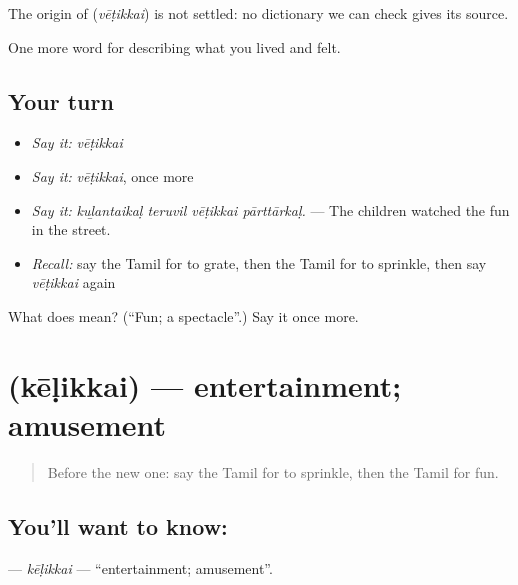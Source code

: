 \begin{cousinweb}
The origin of \textbf{} (\emph{vēṭikkai}) is not settled: no dictionary we can check gives its source.
\end{cousinweb}

\begin{grammarlens}[title={What you've built}]
One more word for describing what you lived and felt.
\end{grammarlens}

\subsection*{Your turn}
\begin{itemize}
\raggedright
  \item \emph{Say it:} \emph{vēṭikkai}
  \item \emph{Say it:} \emph{vēṭikkai}, once more
  \item \emph{Say it:} \emph{kuḻantaikaḷ teruvil vēṭikkai pārttārkaḷ.} — The children watched the fun in the street.
  \item \emph{Recall:} say the Tamil for to grate, then the Tamil for to sprinkle, then say \emph{vēṭikkai} again
\end{itemize}

\begin{tcolorbox}[breakable,colback=teal!4,colframe=teal!35!black,title={Before you move on}]
What does  mean? (\textquotedblleft{}Fun; a spectacle\textquotedblright{}.) Say it once more.
\end{tcolorbox}
\section[\texorpdfstring{\ta{கேளிக்கை} (kēḷikkai)}{கேளிக்கை (kēḷikkai)}]{ (kēḷikkai) — entertainment; amusement}

\label{lesson:TA-C527-kelikkai}



\begin{quote}
Before the new one: say the Tamil for to sprinkle, then the Tamil for fun.
\end{quote}

\subsection*{You'll want to know: }
\textbf{} — \emph{kēḷikkai} — \textquotedblleft{}entertainment; amusement\textquotedblright{}.

